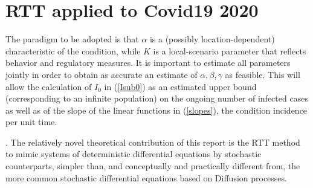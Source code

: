 \documentclass{article}
\begin{document}
\section{RTT applied to Covid19 2020} \label{RTTsection}

The paradigm to be adopted is that $\alpha$ is a (possibly location-dependent) characteristic of the condition, while $K$ is a local-scenario parameter that reflects behavior and regulatory measures. It is important to estimate all parameters jointly in order to obtain as accurate an estimate of $\alpha, \beta, \gamma$ as feasible. This will allow the calculation of $I_0$ in (\ref{Isub0}) as an estimated upper bound (corresponding to an infinite population) on the ongoing number of infected cases as well as of the slope of the linear functions in (\ref{slopes}), the condition incidence per unit time.



\bigskip

. The relatively novel theoretical contribution of this report is the RTT method to mimic systems of deterministic differential equations by stochastic counterparts, simpler than, and conceptually and practically different from, the more common stochastic differential equations based on Diffusion processes.
\end{document}
